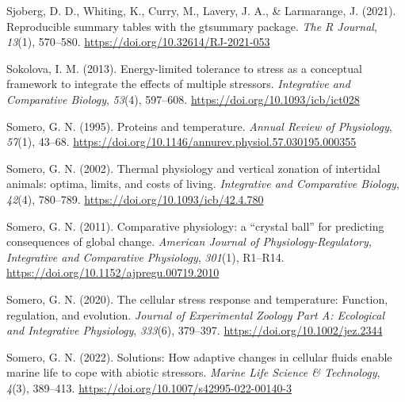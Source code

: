\documentclass{CSUNthesis}
\begin{document}
Sjoberg, D. D., Whiting, K., Curry, M., Lavery, J. A., \& Larmarange, J. (2021). Reproducible summary tables with the gtsummary package. \textit{The R Journal}, \textit{13}(1), 570--580. \url{https://doi.org/10.32614/RJ-2021-053}

\vspace{0.1em}

Sokolova, I. M. (2013). Energy-limited tolerance to stress as a conceptual framework to integrate the effects of multiple stressors. \textit{Integrative and Comparative Biology}, \textit{53}(4), 597--608. \url{https://doi.org/10.1093/icb/ict028}

\vspace{0.1em}

Somero, G. N. (1995). Proteins and temperature. \textit{Annual Review of Physiology}, \textit{57}(1), 43--68. \url{https://doi.org/10.1146/annurev.physiol.57.030195.000355}

\vspace{0.1em}

Somero, G. N. (2002). Thermal physiology and vertical zonation of intertidal animals: optima, limits, and costs of living. \textit{Integrative and Comparative Biology}, \textit{42}(4), 780--789. \url{https://doi.org/10.1093/icb/42.4.780}

\vspace{0.1em}

Somero, G. N. (2011). Comparative physiology: a ``crystal ball'' for predicting consequences of global change. \textit{American Journal of Physiology-Regulatory, Integrative and Comparative Physiology}, \textit{301}(1), R1--R14. \url{https://doi.org/10.1152/ajpregu.00719.2010}

\vspace{0.1em}

Somero, G. N. (2020). The cellular stress response and temperature: Function, regulation, and evolution. \textit{Journal of Experimental Zoology Part A: Ecological and Integrative Physiology}, \textit{333}(6), 379--397. \url{https://doi.org/10.1002/jez.2344}

\vspace{0.1em}

Somero, G. N. (2022). Solutions: How adaptive changes in cellular fluids enable marine life to cope with abiotic stressors. \textit{Marine Life Science \& Technology}, \textit{4}(3), 389--413. \url{https://doi.org/10.1007/s42995-022-00140-3}

\vspace{0.1em}
\end{document}
